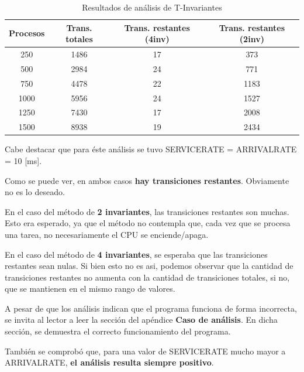 \documentclass{article}
\begin{document}
    \begin{center}
        \begin{table}[H]
            \centering
            \begin{tabular}{||c|c|c|c||} 
                \hline
                Procesos & Trans. totales & Trans. restantes (4inv) & Trans. restantes (2inv) \\ [0.5ex] 
                \hline\hline
                250 & 1486 & 17 & 373 \\ 
                \hline
                500 & 2984 & 24 & 771 \\
                \hline
                750 & 4478 & 22 & 1183 \\
                \hline
                1000 & 5956 & 24 & 1527 \\
                \hline
                1250 & 7430 & 17 & 2008 \\
                \hline
                1500 & 8938 & 19 & 2434 \\
                \hline
            \end{tabular}
            \caption{Resultados de análisis de T-Invariantes}
        \end{table}
    \end{center} \par
    Cabe destacar que para éste análisis se tuvo SERVICERATE = ARRIVALRATE = 10 [ms]. \par
    Como se puede ver, en ambos casos \textbf{hay transiciones restantes}. Obviamente no es
    lo deseado. \par
    En el caso del método de \textbf{2 invariantes}, las transiciones restantes son muchas.
    Esto era esperado, ya que el método no contempla que, cada vez que se procesa una tarea,
    no necesariamente el CPU se enciende/apaga. \par
    En el caso del método de \textbf{4 invariantes}, se esperaba que las transiciones 
    restantes sean nulas. Si bien esto no es asi, podemos observar que la cantidad de 
    transiciones restantes no aumenta con la cantidad de transiciones totales, si no, que se
    mantienen en el mismo rango de valores. \newline \par 
    A pesar de que los análisis indican que el programa funciona de forma incorrecta, se
    invita al lector a leer la sección del apéndice \textbf{Caso de análisis}. En dicha 
    sección, se demuestra el correcto funcionamiento del programa. \newline \par
    También se comprobó que, para una valor de SERVICERATE mucho mayor a ARRIVALRATE, 
    \textbf{el análisis resulta siempre positivo}.
\end{document}
